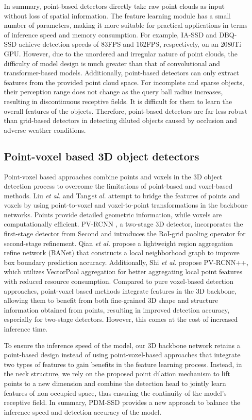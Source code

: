 In summary, point-based detectors directly take raw point clouds as input without loss of spatial information. The feature learning module has a small number of parameters, making it more suitable for practical applications in terms of inference speed and memory consumption. For example, IA-SSD and DBQ-SSD achieve detection speeds of 83FPS and 162FPS, respectively, on an 2080Ti GPU. However, due to the unordered and irregular nature of point clouds, the difficulty of model design is much greater than that of convolutional and transformer-based models. Additionally, point-based detectors can only extract features from the provided point cloud space. For incomplete and sparse objects, their perception range does not change as the query ball radius increases, resulting in discontinuous receptive fields. It is difficult for them to learn the overall features of the objects. Therefore, point-based detectors are far less robust than grid-based detectors \cite{zhu2023understanding} in detecting diluted objects caused by occlusion and adverse weather conditions.

\subsection{Point-voxel based 3D object detectors}
Point-voxel based approaches combine points and voxels in the 3D object detection process to overcome the limitations of point-based and voxel-based methods. Liu \textit{et al.} \cite{liu2019point} and Tang\textit{et al.} \cite{tang2020searching} attempt to bridge the features of points and voxels by using point-to-voxel and voxel-to-point transformations in the backbone networks. Points provide detailed geometric information, while voxels are computationally efficient. PV-RCNN \cite{shi2023pv}, a two-stage 3D detector, incorporates the first-stage detector from Second \cite{yan2018second} and introduces the RoI-grid pooling operator for second-stage refinement. Qian \textit{et al.} \cite{qian2022badet} propose a lightweight region aggregation refine network (BANet) that constructs a local neighborhood graph to improve box boundary prediction accuracy. Additionally, Shi \textit{et al.} \cite{shi2023pv} propose PV-RCNN++, which utilizes VectorPool aggregation for better aggregating local point features with reduced resource consumption. Compared to pure voxel-based detection approaches, point-voxel based methods integrate features in the 3D backbone, allowing them to benefit from both fine-grained 3D shape and structure information obtained from points, resulting in improved detection accuracy, especially for two-stage detectors. However, this comes at the cost of increased inference time.

To ensure the inference speed of the model, our 3D backbone network retains a point-based design instead of using point-voxel-based approaches that integrate two types of features to gain benefits in the feature learning process. Instead, in the neck structure, we rely on the proposed point dilation mechanism to lift points to a new dimension and combine the detection head to jointly learn features of non-occupied space, thus ensuring the continuity of the model's receptive field. In summary, PDM-SSD provides a new approach to balance the inference speed and detection accuracy of the model.